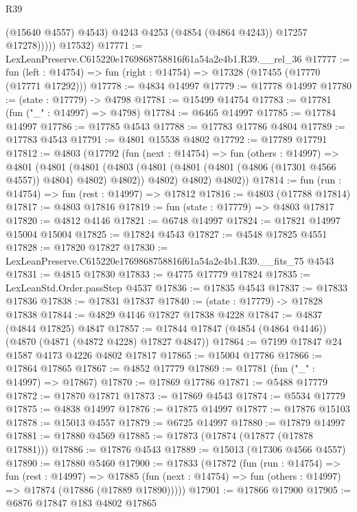 \begin{lexlean}{R39}
\begin{coremodule}
                  (@15640 @4557)
                  @4543)
                @4243
                @4253
                (@4854 (@4864 @4243))
                @17257
                @17278)))))
      @17532)
@17771 := LexLeanPreserve.C615220e1769868758816f61a54a2e4b1.R39.__rel_36
@17777 := fun (left : @14754) => fun (right : @14754) => @17328 (@17455 (@17770 (@17771 @17292)))
@17778 := @4834 @14997
@17779 := @17778 @14997
@17780 := (state : @17779) -> @4798
@17781 := @15499 @14754
@17783 := @17781 (fun ("_" : @14997) => @4798)
@17784 := @6465 @14997
@17785 := @17784 @14997
@17786 := @17785 @4543
@17788 := @17783 @17786 @4804
@17789 := @17783 @4543
@17791 := @4801 @15538 @4802
@17792 := @17789 @17791
@17812 := @4803
    (@17792
      (fun (next : @14754) =>
      fun (others : @14997) =>
      @4801
        (@4801
          (@4801
            (@4803 (@4801 (@4801 (@4801 (@4806 (@17301 @4566 @4557)) @4804) @4802) @4802))
            @4802)
          @4802)
        @4802))
@17814 := fun (run : @14754) => fun (rest : @14997) => @17812
@17816 := @4803 (@17788 @17814)
@17817 := @4803 @17816
@17819 := fun (state : @17779) => @4803 @17817
@17820 := @4812 @4146
@17821 := @6748 @14997
@17824 := @17821 @14997 @15004 @15004
@17825 := @17824 @4543
@17827 := @4548 @17825 @4551
@17828 := @17820 @17827
@17830 := LexLeanPreserve.C615220e1769868758816f61a54a2e4b1.R39.__fits_75 @4543
@17831 := @4815 @17830
@17833 := @4775 @17779 @17824
@17835 := LexLeanStd.Order.passStep @4537
@17836 := @17835 @4543
@17837 := @17833 @17836
@17838 := @17831 @17837
@17840 := (state : @17779) -> @17828 @17838
@17844 := @4829 @4146 @17827 @17838 @4228
@17847 := @4837 (@4844 @17825) @4847
@17857 := @17844 @17847 (@4854 (@4864 @4146)) (@4870 (@4871 (@4872 @4228) @17827 @4847))
@17864 := @7199 @17847 @24 @1587 @4173 @4226 @4802 @17817
@17865 := @15004 @17786
@17866 := @17864 @17865
@17867 := @4852 @17779
@17869 := @17781 (fun ("_" : @14997) => @17867)
@17870 := @17869 @17786
@17871 := @5488 @17779
@17872 := @17870 @17871
@17873 := @17869 @4543
@17874 := @5534 @17779
@17875 := @4838 @14997
@17876 := @17875 @14997
@17877 := @17876 @15103
@17878 := @15013 @4557
@17879 := @6725 @14997
@17880 := @17879 @14997
@17881 := @17880 @4569
@17885 := @17873 (@17874 (@17877 (@17878 @17881)))
@17886 := @17876 @4543
@17889 := @15013 (@17306 @4566 @4557)
@17890 := @17880 @5460
@17900 := @17833
    (@17872
      (fun (run : @14754) =>
      fun (rest : @14997) =>
      @17885 (fun (next : @14754) => fun (others : @14997) => @17874 (@17886 (@17889 @17890)))))
@17901 := @17866 @17900
@17905 := @6876 @17847 @183 @4802 @17865

\end{coremodule}
\end{lexlean}
